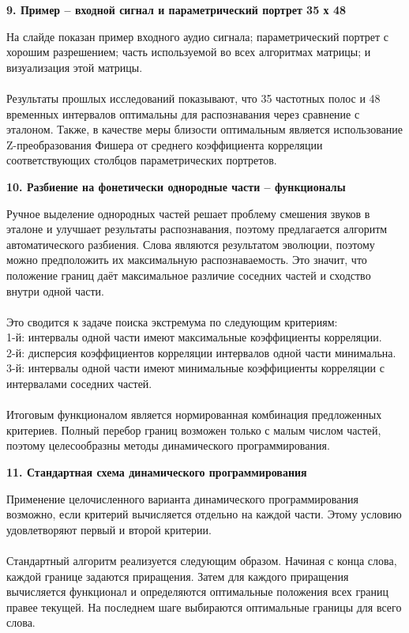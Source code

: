 \documentclass[a4paper, 12pt]{article}
\begin{document}
	
	
	\begin{center}
		\textbf{\large 9. Пример – входной сигнал и параметрический портрет 35 х 48}
	\end{center}	
	\noindent
	На слайде показан пример входного аудио сигнала; параметрический портрет с хорошим разрешением; часть используемой во всех алгоритмах матрицы; и визуализация этой матрицы.
	\\\\
	Результаты прошлых исследований показывают, что 35 частотных полос и 48 временных интервалов оптимальны для распознавания через сравнение с эталоном. Также, в качестве меры близости оптимальным является использование Z-преобразования Фишера от среднего коэффициента корреляции соответствующих столбцов параметрических портретов.
	
	
	
	\begin{center}
		\textbf{\large 10. Разбиение на фонетически однородные части – функционалы}
	\end{center}	
	\noindent
	Ручное выделение однородных частей решает проблему смешения звуков в эталоне и улучшает результаты распознавания, поэтому предлагается алгоритм автоматического разбиения. Слова являются результатом эволюции, поэтому можно предположить их максимальную распознаваемость. Это значит, что положение границ даёт максимальное различие соседних частей и сходство внутри одной части. 
	\\\\
	Это сводится к задаче поиска экстремума по следующим критериям:
	\\
	1-й: интервалы одной части имеют максимальные коэффициенты корреляции.
	\\
	2-й: дисперсия коэффициентов корреляции интервалов одной части минимальна.
	\\
	3-й: интервалы одной части имеют минимальные коэффициенты корреляции с интервалами соседних частей.
	\\\\
	Итоговым функционалом является нормированная комбинация предложенных критериев. Полный перебор границ возможен только с малым числом частей, поэтому целесообразны методы динамического программирования.
	
	
	
	\begin{center}
		\textbf{\large 11. Стандартная схема динамического программирования}
	\end{center}	
	\noindent
	Применение целочисленного варианта динамического программирования возможно, если критерий вычисляется отдельно на каждой части. Этому условию удовлетворяют первый и второй критерии.
	\\\\
	Стандартный алгоритм реализуется следующим образом. Начиная с конца слова, каждой границе задаются приращения. Затем для каждого приращения вычисляется функционал и определяются оптимальные положения всех границ правее текущей. На последнем шаге выбираются оптимальные границы для всего слова.
	
\end{document}
